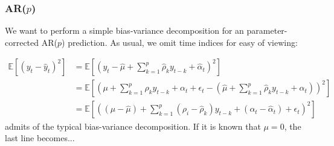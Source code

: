 \documentclass[9pt]{beamer}
\def\E{\mathbb{E}} %
\theoremstyle{definition}
\begin{document}
    





\begin{frame}\frametitle{AR($p$)}

    We want to perform a simple bias-variance decomposition for an parameter-corrected AR($p$) prediction.  As usual, we omit time indices for easy of viewing:

    \begin{align}
        \E[(y_{t}-\hat{y}_{t})^{2}] &= \E[(y_{t} - \hat\mu + \sum^{p}_{k=1}\hat\rho_{k}y_{t-k} + \hat{\alpha}_{t})^{2}]\\
        &= \E[(\mu + \sum^{p}_{k=1}\rho_{k}y_{t-k} + \alpha_{t} + \epsilon_{t}  - (\hat\mu + \sum^{p}_{k=1}\hat\rho_{k}y_{t-k} + \hat{\alpha}_{t}))^{2}] \\
        &= \E[((\mu - \hat\mu) + \sum^{p}_{k=1}(\rho_{i}-\hat\rho_{k})y_{t-k} + (\alpha_{t} - \hat{\alpha}_{t}) + \epsilon_{t} )^{2}]
        \end{align}
      admits of the typical bias-variance decomposition.  If it is known that $\mu = 0$, the last line becomes...

\end{frame}
\end{document}
